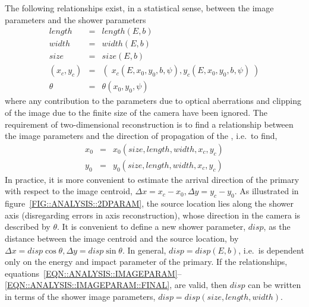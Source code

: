 The following relationships exist, in a statistical sense, between the
image parameters and the shower parameters
\begin{eqnarray}\label{EQN::ANALYSIS::IMAGEPARAM}
length & = & length(E, b) \\
width & = & width(E, b) \\
size & = & size(E, b) \\
(x_c, y_c) & = & (\;x_c(E, x_0, y_0, b, \psi), y_c(E, x_0, y_0, b, \psi)\;) \\
\theta & = & \theta(x_0, y_0, \psi) \label{EQN::ANALYSIS::IMAGEPARAM::FINAL}
\end{eqnarray}
where any contribution to the parameters due to optical aberrations
and clipping of the image due to the finite size of the camera have
been ignored. The requirement of two-dimensional reconstruction is to
find a relationship between the image parameters and the direction of
propagation of the \Gray, i.e.\ to find,
\begin{eqnarray*}
x_0 & = & x_0(size, length, width, x_c, y_c) \\
y_0 & = & y_0(size, length, width, x_c, y_c)
\end{eqnarray*}
In practice, it is more convenient to estimate the arrival direction
of the primary with respect to the image centroid, $\Delta x=x_c-x_0,
\Delta y=y_c-y_0$. As illustrated in
figure~\ref{FIG::ANALYSIS::2DPARAM}, the \Gray source location lies
along the shower axis (disregarding errors in axis reconstruction),
whose direction in the camera is described by $\theta$. It is
convenient to define a new shower parameter, $disp$, as the distance
between the image centroid and the source location, by $\Delta x=disp
\cos\theta,
\Delta y=disp \sin\theta$. In general, $disp=disp(E, b)$, i.e.\ is
dependent only on the energy and impact parameter of the primary. If
the relationships,
equations~\ref{EQN::ANALYSIS::IMAGEPARAM}--\ref{EQN::ANALYSIS::IMAGEPARAM::FINAL},
are valid, then $disp$ can be written in terms of the shower image
parameters, $disp=disp(size, length, width).$

